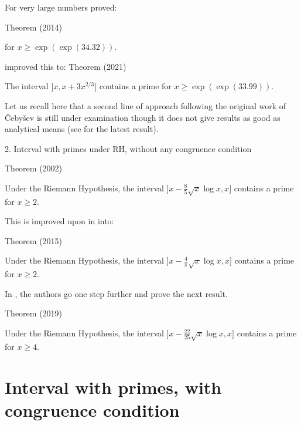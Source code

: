 For very large numbers \cite{Dudek*16b} proved:
\begin{thm}{Theorem (2014)}

  for $x \ge \exp(\exp(34.32)).$



 

\cite{Cully*21} improved this to:
Theorem (2021)

 The interval $]x, x + 3x^{2/3}]$ contains a prime
  for $x \ge \exp(\exp(33.99)).$



\par 

Let us recall here that a second line of approach following the original
work of \v Ceby\v sev is still under examination though it does not give
results as good
as analytical means (see
\cite{CostaPereira*89}
for the latest result).





  
2. Interval with primes under RH, without any congruence condition



\par Theorem (2002)


Under the Riemann Hypothesis, the interval $\bigl]x-\tfrac85\sqrt{x}\log x,x\bigr]$
contains a prime for $x\ge2$.
\end{thm}

This is improved upon
in \cite{Dudek*15} into:
\begin{thm}{Theorem (2015)}

Under the Riemann Hypothesis, the interval $\bigl]x-\tfrac4{\pi}\sqrt{x}\log x,x\bigr]$
contains a prime for $x\ge2$.
\end{thm}


In \cite{Carneiro-Milinovich-Soundararajan*19}, the authors go one step further and prove the next result.
\begin{thm}{Theorem (2019)}

Under the Riemann Hypothesis, the interval $\bigl]x-\tfrac{22}{25}\sqrt{x}\log x,x\bigr]$
contains a prime for $x\ge4$.
\end{thm}



\par 







\section{Interval with primes, with congruence condition}




